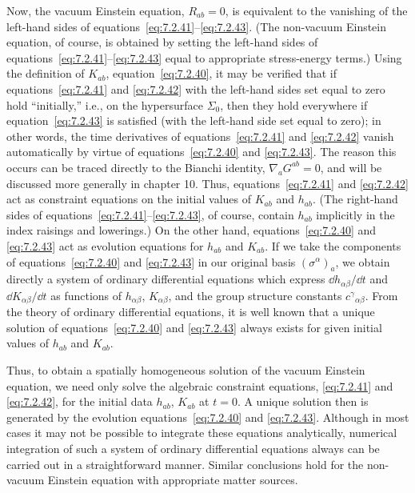 Now, the vacuum Einstein equation, \(R_{ab}=0\), is equivalent to the vanishing of
the left-hand sides of equations~\eqref{eq:7.2.41}--\eqref{eq:7.2.43}. (The
non-vacuum Einstein equation, of course, is obtained by setting the left-hand sides
of equations~\eqref{eq:7.2.41}--\eqref{eq:7.2.43} equal to appropriate
stress-energy terms.) Using the definition of \(K_{ab}\),
equation~\eqref{eq:7.2.40}, it may be verified that if
equations~\eqref{eq:7.2.41} and \eqref{eq:7.2.42} with the left-hand sides set
equal to zero hold “initially,” i.e., on the hypersurface \(\Sigma_0\), then they
hold everywhere if equation~\eqref{eq:7.2.43} is satisfied (with the left-hand
side set equal to zero); in other words, the time derivatives of
equations~\eqref{eq:7.2.41} and \eqref{eq:7.2.42} vanish automatically by virtue
of equations~\eqref{eq:7.2.40} and \eqref{eq:7.2.43}. The reason this occurs can
be traced directly to the Bianchi identity, \(\nabla_aG^{ab}=0\), and will be
discussed more generally in chapter 10. Thus, equations~\eqref{eq:7.2.41} and
\eqref{eq:7.2.42} act as constraint equations on the initial values of \(K_{ab}\)
and \(h_{ab}\). (The right-hand sides of
equations~\eqref{eq:7.2.41}--\eqref{eq:7.2.43}, of course, contain \(h_{ab}\)
implicitly in the index raisings and lowerings.) On the other hand,
equations~\eqref{eq:7.2.40} and \eqref{eq:7.2.43} act as evolution equations for
\(h_{ab}\) and \(K_{ab}\). If we take the components of
equations~\eqref{eq:7.2.40} and \eqref{eq:7.2.43} in our original basis
\((\sigma^\alpha)_a\), we obtain directly a system of ordinary differential
equations which express \(\dd h_{\alpha\beta}/\dd t\) and \(\dd K_{\alpha\beta}/\dd t\) as
functions of \(h_{\alpha\beta}\), \(K_{\alpha\beta}\), and the group structure
constants \(c^\gamma{}_{\alpha\beta}\). From the theory of ordinary differential
equations, it is well known that a unique solution of equations~\eqref{eq:7.2.40}
and \eqref{eq:7.2.43} always exists for given initial values of \(h_{ab}\) and
\(K_{ab}\).

Thus, to obtain a spatially homogeneous solution of the vacuum Einstein equation,
we need only solve the algebraic constraint equations, \eqref{eq:7.2.41} and
\eqref{eq:7.2.42}, for the initial data \(h_{ab}\), \(K_{ab}\) at \(t=0\). A
unique solution then is generated by the evolution equations~\eqref{eq:7.2.40}
and \eqref{eq:7.2.43}. Although in most cases it may not be possible to integrate
these equations analytically, numerical integration of such a system of ordinary
differential equations always can be carried out in a straightforward manner.
Similar conclusions hold for the non-vacuum Einstein equation with appropriate
matter sources.

